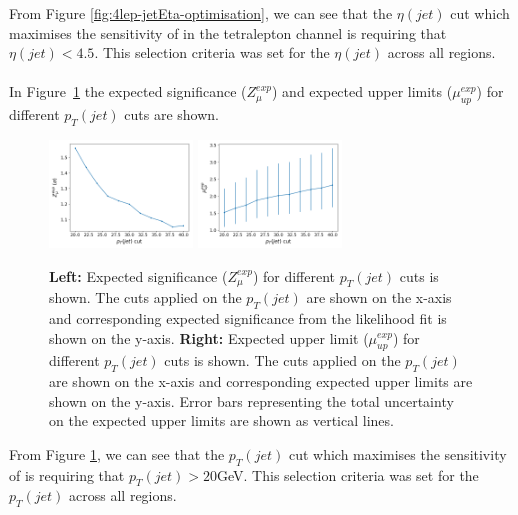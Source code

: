 From Figure \ref{fig:4lep-jetEta-optimisation}, we can see that the $\eta(jet)$ cut which maximises the sensitivity of \tWZ in the tetralepton channel is requiring that $\eta(jet) < 4.5$. This selection criteria was set for the $\eta(jet)$ across all regions.\\\\

In Figure~\ref{fig:4lep-jetpt-optimisation} the expected significance ($Z_{\mu}^{exp}$) and expected upper limits ($\mu_{up}^{exp}$) for different $p_{T}(jet)$ cuts are shown.
\begin{figure}[h!]
	\includegraphics[width = 0.34\textwidth]{figures/signif_jetPt.png}
  	\includegraphics[width = 0.34\textwidth]{figures/exp_upper_jetPt.png}
  \centering
	\caption{\textbf{Left:} Expected significance ($Z_{\mu}^{exp}$) for different $p_{T}(jet)$ cuts is shown. The cuts applied on the $p_{T}(jet)$ are shown on the x-axis and corresponding expected significance from the likelihood fit is shown on the y-axis. \textbf{Right:} Expected upper limit ($\mu_{up}^{exp}$) for different $p_{T}(jet)$ cuts is shown. The cuts applied on the $p_{T}(jet)$ are shown on the x-axis and corresponding expected upper limits are shown on the y-axis. Error bars representing the total uncertainty on the expected upper limits are shown as vertical lines.}
		\label{fig:4lep-jetpt-optimisation}
\end{figure}


From Figure \ref{fig:4lep-jetpt-optimisation}, we can see that the $p_{T}(jet)$ cut which maximises the sensitivity of \tWZ is requiring that $p_{T}(jet) > 20$GeV. This selection criteria was set for the $p_{T}(jet)$ across all regions.\\\\


